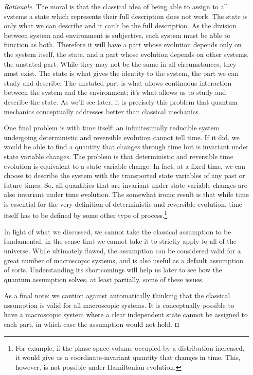 \documentclass[smallextended]{svjour3}
\numberwithin{equation}{section}
\newenvironment{rationale}{\emph{Rationale}.}{\hfill\(\qed\)}
\begin{document}
\begin{rationale}
	The moral is that the classical idea of being able to assign to all systems a state which represents their full description does not work. The state is only what we can describe and it can't be the full description. As the division between system and environment is subjective, each system must be able to function as both. Therefore it will have a part whose evolution depends only on the system itself, the state, and a part whose evolution depends on other systems, the unstated part. While they may not be the same in all circumstances, they must exist. The state is what gives the identity to the system, the part we can study and describe. The unstated part is what allows continuous interaction between the system and the environment; it's what allows us to study and describe the state. As we'll see later, it is precisely this problem that quantum mechanics conceptually addresses better than classical mechanics.
	
	One final problem is with time itself: an infinitesimally reducible system undergoing deterministic and reversible evolution cannot tell time. If it did, we would be able to find a quantity that changes through time but is invariant under state variable changes. The problem is that deterministic and reversible time evolution is equivalent to a state variable change. In fact, at a fixed time, we can choose to describe the system with the transported state variables of any past or future times. So, all quantities that are invariant under state variable changes are also invariant under time evolution. The somewhat ironic result is that while time is essential for the very definition of deterministic and reversible evolution, time itself has to be defined by some other type of process.\footnote{For example, if the phase-space volume occupied by a distribution increased, it would give us a coordinate-invariant quantity that changes in time. This, however, is not possible under Hamiltonian evolution.}
	
	In light of what we discussed, we cannot take the classical assumption to be fundamental, in the sense that we cannot take it to strictly apply to all of the universe. While ultimately flawed, the  assumption can be considered valid for a great number of macroscopic systems, and is also useful as a default assumption of sorts. Understanding its shortcomings will help us later to see how the quantum assumption solves, at least partially, some of these issues.
	
	As a final note: we caution against automatically thinking that the classical assumption is valid for all macroscopic systems. It is conceptually possible to have a macroscopic system where a clear independent state cannot be assigned to each part, in which case the assumption would not hold.
\end{rationale}
\end{document}
